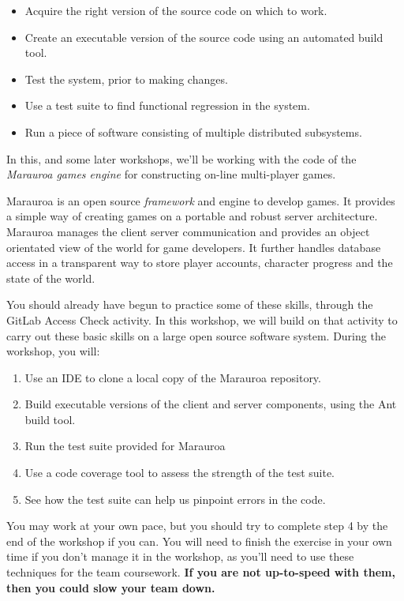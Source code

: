 \documentclass[
]{book}
\providecommand{\tightlist}{%
  \setlength{\itemsep}{0pt}\setlength{\parskip}{0pt}}
\begin{document}
\begin{itemize}
\tightlist
\item
  Acquire the right version of the source code on which to work.
\item
  Create an executable version of the source code using an automated build tool.
\item
  Test the system, prior to making changes.
\item
  Use a test suite to find functional regression in the system.\\
\item
  Run a piece of software consisting of multiple distributed subsystems.
\end{itemize}

In this, and some later workshops, we'll be working with the code of the \emph{Marauroa games engine} for constructing on-line multi-player games.

Marauroa is an open source \emph{framework} and engine to develop games. It provides a simple way of creating games on a portable and robust server architecture. Marauroa manages the client server communication and provides an object orientated view of the world for game developers. It further handles database access in a transparent way to store player accounts, character progress and the state of the world.

You should already have begun to practice some of these skills, through the GitLab Access Check activity.
In this workshop, we will build on that activity to carry out these basic skills on a large open source software system. During the workshop, you will:

\begin{enumerate}
\def\labelenumi{\arabic{enumi}.}
\tightlist
\item
  Use an IDE to clone a local copy of the Marauroa repository.
\item
  Build executable versions of the client and server components, using the Ant build tool.
\item
  Run the test suite provided for Marauroa
\item
  Use a code coverage tool to assess the strength of the test suite.
\item
  See how the test suite can help us pinpoint errors in the code.
\end{enumerate}

You may work at your own pace, but you should try to complete step 4 by the end of the workshop if you can. You will need to finish the exercise in your own time if you don't manage it in the workshop, as you'll need to use these techniques for the team coursework. \textbf{If you are not up-to-speed with them, then you could slow your team down.}
\end{document}
